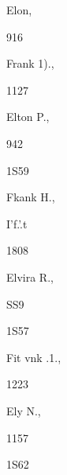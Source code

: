 Elon, 


916 




Frank 1)., 


1127 




Elton P., 


942 


1S59 


Fkank H., 


I'f.'.t 


1808 


Elvira R., 


SS9 


1S57 


Fit vnk .1., 


1223 




Ely N., 


1157 


1S62 


